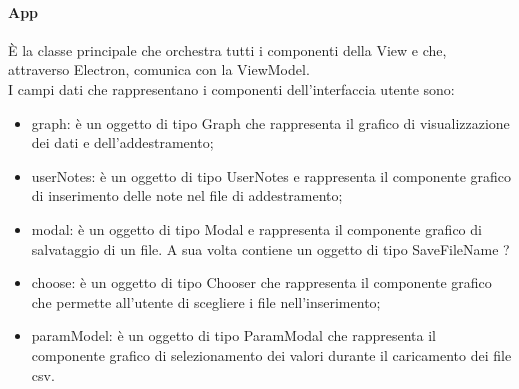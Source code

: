 		\paragraph*{App}
		È la classe principale che orchestra tutti i componenti della View e che, attraverso Electron, comunica con la ViewModel. \\
		I campi dati che rappresentano i componenti dell'interfaccia utente sono:
		\begin{itemize}
			\item graph: è un oggetto di tipo Graph che rappresenta il grafico di visualizzazione dei dati e dell'addestramento;
			\item userNotes: è un oggetto di tipo UserNotes e rappresenta il componente grafico di inserimento delle note nel file di addestramento;
			\item modal: è un oggetto di tipo Modal e rappresenta il componente grafico di salvataggio di un file. A sua volta contiene un oggetto di tipo SaveFileName ?
			\item choose: è un oggetto di tipo Chooser che rappresenta il componente grafico che permette all'utente di scegliere i file nell'inserimento;
			\item paramModel: è un oggetto di tipo ParamModal che rappresenta il componente grafico di selezionamento dei valori durante il caricamento dei file csv.
		\end{itemize}
